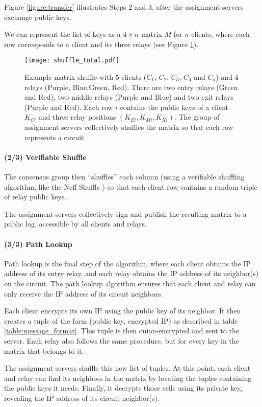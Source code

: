 Figure \ref{figure:transfer} illustrates Steps 2 and 3, after the assignment
servers exchange public keys.

We can represent the list of keys as a $4 \times n$ matrix $M$ for $n$
clients, where each row corresponds to a client and its three relays (see
Figure \ref{figure:shuffle}).

\begin{figure}
  \centering
    \texttt{[image: shuffle\_total.pdf]}
  \caption{Example matrix shuffle with 5 clients ($C_1$, $C_2$, $C_3$, $C_4$ and $C_5$) and 4
relays (Purple, Blue,Green, Red). There are two entry relays (Green and Red),
two middle relays (Purple and Blue) and two exit relays (Purple and Red). Each
row $i$ contains the public keys of a client $K_{Ci}$ and three relay positions
$(K_{Ei}, K_{Mi}, K_{Xi})$. The group of assignment servers collectively shuffles
the matrix so that each row represents a circuit.}
  \label{figure:shuffle}
\end{figure}


\paragraph{(2/3) Verifiable Shuffle} The consensus group then ``shuffles''
each column (using a verifiable shuffling algorithm, like the Neff Shuffle
\cite{neff2001verifiable}) so that each client row contains a random triple of
relay public keys.

The assignment servers collectively sign and publish the resulting matrix to a
public log, accessible by all clients and relays.

\paragraph{(3/3) Path Lookup}
Path lookup is the final step of the algorithm, where each client obtains the
IP address of its entry relay, and each relay obtains the IP address of its
neighbor(s) on the circuit. The path lookup algorithm ensures that each client
and relay can only receive the IP address of its circuit neighbors.

Each client encrypts its own IP using the public key of its neighbor. It then
creates a tuple of the form (public key, encrypted IP) as described in table
\ref{table:message_format}. This tuple is then onion-encrypted and sent to the
server.  Each relay also follows the same procedure, but for every key in the
matrix that belongs to it.

The assignment servers shuffle this new list of tuples. At this point, each
client and relay can find its neighbors in the matrix by locating the tuples
containing the public keys it needs. Finally, it decrypts those cells using
its private key, revealing the IP address of its circuit neighbor(s).

